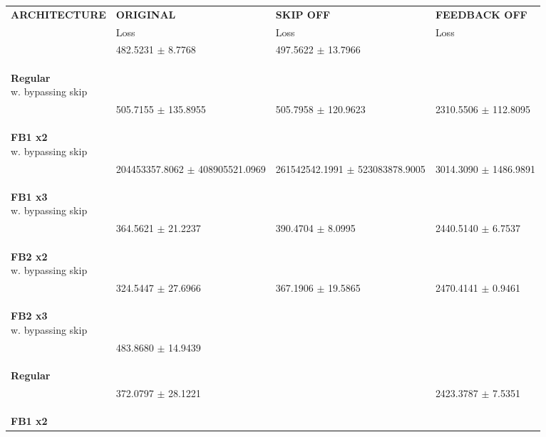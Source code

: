 
\begin{table}[ht]
    \centering
    \begin{tabular}{|>{\columncolor{gray!05}}l|l|l|l|}
        \hline
        \rowcolor{gray!20}
        \textbf{\footnotesize ARCHITECTURE} & \textbf{\footnotesize ORIGINAL} & \textbf{\footnotesize SKIP OFF} & \textbf{\footnotesize FEEDBACK OFF} \\

        \rowcolor{gray!20}
        & {\footnotesize Loss} & {\footnotesize Loss} & {\footnotesize Loss} \\
        \hline
\shortstack[l]{\\ {} \\ \textbf{Regular}\\{w. bypassing skip}} & 482.5231 $\pm$ 8.7768 & 497.5622 $\pm$ 13.7966 &  \\
 \hline 
\shortstack[l]{\\ {} \\ \textbf{FB1 x2}\\{w. bypassing skip}} & 505.7155 $\pm$ 135.8955 & 505.7958 $\pm$ 120.9623 & 2310.5506 $\pm$ 112.8095 \\
 \hline 
\shortstack[l]{\\ {} \\ \textbf{FB1 x3}\\{w. bypassing skip}} & 204453357.8062 $\pm$ 408905521.0969 & 261542542.1991 $\pm$ 523083878.9005 & 3014.3090 $\pm$ 1486.9891 \\
 \hline 
\shortstack[l]{\\ {} \\ \textbf{FB2 x2}\\{w. bypassing skip}} & 364.5621 $\pm$ 21.2237 & 390.4704 $\pm$ 8.0995 & 2440.5140 $\pm$ 6.7537 \\
 \hline 
\shortstack[l]{\\ {} \\ \textbf{FB2 x3}\\{w. bypassing skip}} & 324.5447 $\pm$ 27.6966 & 367.1906 $\pm$ 19.5865 & 2470.4141 $\pm$ 0.9461 \\
 \hline 
\shortstack[l]{\\ {} \\ \textbf{Regular}\\{}} & 483.8680 $\pm$ 14.9439 &  &  \\
 \hline 
\shortstack[l]{\\ {} \\ \textbf{FB1 x2}\\{}} & 372.0797 $\pm$ 28.1221 &  & 2423.3787 $\pm$ 7.5351 \\

\end{tabular}
\end{table}
